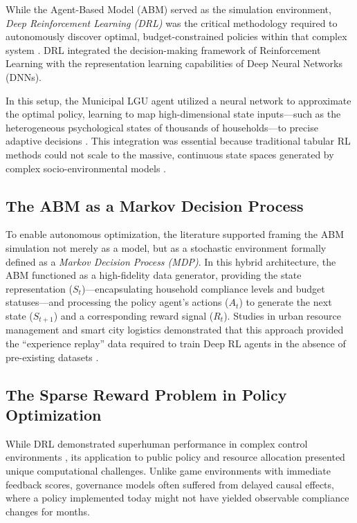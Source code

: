 
While the Agent-Based Model (ABM) served as the simulation environment, \textit{Deep Reinforcement Learning (DRL)} was the critical methodology required to autonomously discover optimal, budget-constrained policies within that complex system \citep{ZhengAI2022}. DRL integrated the decision-making framework of Reinforcement Learning with the representation learning capabilities of Deep Neural Networks (DNNs).

In this setup, the Municipal LGU agent utilized a neural network to approximate the optimal policy, learning to map high-dimensional state inputs—such as the heterogeneous psychological states of thousands of households—to precise adaptive decisions \citep{Hertweck2023Values}. This integration was essential because traditional tabular RL methods could not scale to the massive, continuous state spaces generated by complex socio-environmental models \citep{Mousavi2021Overview}.

\subsection{The ABM as a Markov Decision Process}
\label{subsec:abm_mdp}

To enable autonomous optimization, the literature supported framing the ABM simulation not merely as a model, but as a stochastic environment formally defined as a \textit{Markov Decision Process (MDP)}. In this hybrid architecture, the ABM functioned as a high-fidelity data generator, providing the state representation ($S_t$)—encapsulating household compliance levels and budget statuses—and processing the policy agent’s actions ($A_t$) to generate the next state ($S_{t+1}$) and a corresponding reward signal ($R_t$). Studies in urban resource management \citep{Rajesh2025} and smart city logistics \citep{HaMinh2025} demonstrated that this approach provided the ``experience replay'' data required to train Deep RL agents in the absence of pre-existing datasets \citep{Kompella2017}.

\subsection{The Sparse Reward Problem in Policy Optimization}
\label{subsec:sparse_reward}

While DRL demonstrated superhuman performance in complex control environments \citep{Silver2016}, its application to public policy and resource allocation presented unique computational challenges. Unlike game environments with immediate feedback scores, governance models often suffered from delayed causal effects, where a policy implemented today might not have yielded observable compliance changes for months.

